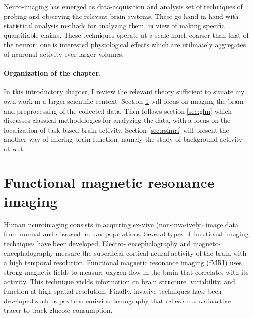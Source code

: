 Neuro-imaging has emerged as data-acquisition and analysis set of techniques of probing and observing the relevant brain systems. These go hand-in-hand with
  statistical analysis methods for analyzing them, in view of making specific quantifiable claims. These techniques operate at a scale much coarser than that of the neuron: one is interested physiological effects which are utilmately aggregates of neuronal activity over larger volumes.

  \paragraph{Organization of the chapter.} In this introductory chapter, I review the relevant theory sufficient to situate my own work in a larger scientific context. Section \ref{sec:fmri} will
  focus on imaging the brain and preprocessing of the collected data. Then follows section \ref{sec:glm} which discusses classical methodologies for analyzing the data, with a focus on the localization of task-based brain activity.
  Section \ref{sec:rsfmri} will present the another way of infering brain function,
  namely the study of background activity at rest.


\section{Functional magnetic resonance imaging}
\label{sec:fmri}
Human neuroimaging consists in acquiring ex-vivo
(non-invasively) image data from normal and
diseased human populations.
Several types of functional imaging techniques have been developed. Electro-
encephalography and magneto-encephalography measure the superficial cortical neural activity of the brain with a high temporal resolution. Functional
magnetic resonance imaging (fMRI) uses strong magnetic fields to measure
oxygen flow in the brain that correlates with its activity. This technique yields
information on brain structure, variability, and function at high
spatial resolution. Finally, invasive
techniques have been developed such as positron emission tomography that
relies on a radioactive tracer to track glucose consumption.

